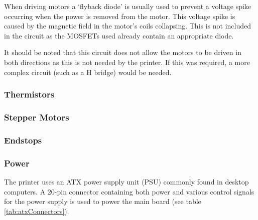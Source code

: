 				When driving motors a `flyback diode' is usually used to prevent a
				voltage spike occurring when the power is removed from the motor. This
				voltage spike is caused by the magnetic field in the motor's coils
				collapsing. This is not included in the circuit as the MOSFETs used
				already contain an appropriate diode.
				
				It should be noted that this circuit does not allow the motors to be
				driven in both directions as this is not needed by the printer. If this
				was required, a more complex circuit (such as a H bridge) would be
				needed.
			
			\subsubsection{Thermistors}
			
			\subsubsection{Stepper Motors}
			
			\subsubsection{Endstops}
				
			\subsubsection{Power}
				
				The printer uses an ATX power supply unit (PSU) commonly found in
				desktop computers. A 20-pin connector containing both power and various
				control signals for the power supply is used to power the main board
				(see table \ref{tab:atxConnectors}).
				

